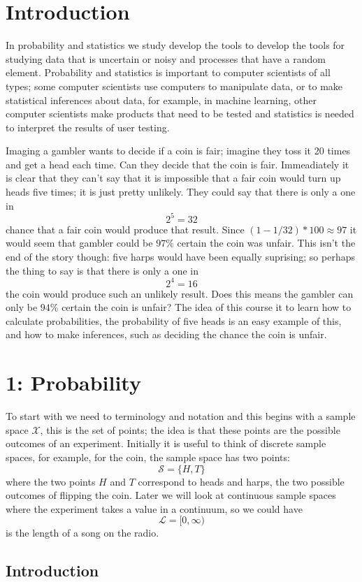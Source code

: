 \documentclass[11pt,a4paper]{scrartcl}
\begin{document}
\section*{Introduction}

In probability and statistics we study develop the tools to develop
the tools for studying data that is uncertain or noisy and processes
that have a random element. Probability and statistics is important to
computer scientists of all types; some computer scientists use
computers to manipulate data, or to make statistical inferences about
data, for example, in machine learning, other computer scientists make
products that need to be tested and statistics is needed to interpret
the results of user testing.

Imaging a gambler wants to decide if a coin is fair; imagine they toss
it 20 times and get a head each time. Can they decide that the coin is
fair. Immeadiately it is clear that they can't say that it is
impossible that a fair coin would turn up heads five times; it is just pretty unlikely. They could say that there is only a one in 
\begin{equation}
2^{5}=32
\end{equation}
chance that a fair coin would produce that result. Since
$(1-1/32)*100\approx 97$ it would seem that gambler could be $97\%$
certain the coin was unfair. This isn't the end of the story though:
five harps would have been equally suprising; so perhaps the thing to
say is that there is only a one in
\begin{equation}
2^{4}=16
\end{equation}
the coin would produce such an unlikely result. Does this means the
gambler can only be $94\%$ certain the coin is unfair? The idea of
this course it to learn how to calculate probabilities, the
probability of five heads is an easy example of this, and how to make
inferences, such as deciding the chance the coin is unfair.


\section*{1: Probability}

To start with we need to terminology and notation and this begins with
a sample space $\mathcal{X}$, this is the set of points; the idea is
that these points are the possible outcomes of an
experiment. Initially it is useful to think of discrete sample spaces,
for example, for the coin, the sample space has two points:
\begin{equation}
\mathcal{S}=\{H,T\}
\end{equation}
where the two points $H$ and $T$ correspond to heads and harps, the
two possible outcomes of flipping the coin. Later we will look at
continuous sample spaces where the experiment takes a value in a
continuum, so we could have
\begin{equation}
\mathcal{L}=[0,\infty)
\end{equation}
is the length of a song on the radio.







\subsection*{Introduction}
\end{document}

